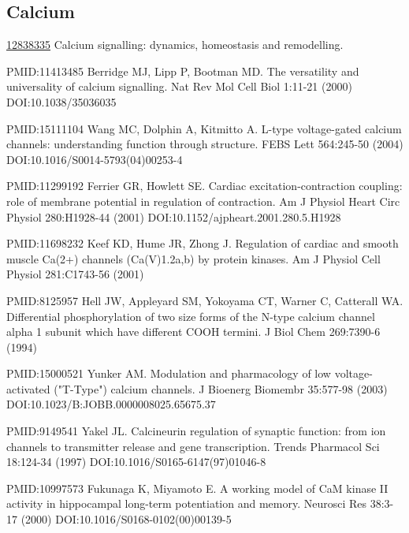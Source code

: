 \begin{thebibliography}{00}
\section{Calcium} 

\href{https://www.ncbi.nlm.nih.gov//pubmed//12838335}{12838335} Calcium signalling: dynamics, homeostasis and remodelling.

PMID:11413485
 Berridge MJ, Lipp P, Bootman MD.
\newblock The versatility and universality of calcium signalling.
\newblock Nat Rev Mol Cell Biol 1:11-21 (2000) DOI:10.1038/35036035

PMID:15111104
 Wang MC, Dolphin A, Kitmitto A.
\newblock L-type voltage-gated calcium channels: understanding function through structure.
\newblock FEBS Lett 564:245-50 (2004) DOI:10.1016/S0014-5793(04)00253-4

PMID:11299192
 Ferrier GR, Howlett SE.
\newblock Cardiac excitation-contraction coupling: role of membrane potential in regulation of contraction.
\newblock Am J Physiol Heart Circ Physiol 280:H1928-44 (2001) DOI:10.1152/ajpheart.2001.280.5.H1928

PMID:11698232
 Keef KD, Hume JR, Zhong J.
\newblock Regulation of cardiac and smooth muscle Ca(2+) channels (Ca(V)1.2a,b) by protein kinases.
\newblock Am J Physiol Cell Physiol 281:C1743-56 (2001)

PMID:8125957
 Hell JW, Appleyard SM, Yokoyama CT, Warner C, Catterall WA.
\newblock Differential phosphorylation of two size forms of the N-type calcium channel alpha 1 subunit which have different COOH termini.
\newblock J Biol Chem 269:7390-6 (1994)

PMID:15000521
 Yunker AM.
\newblock Modulation and pharmacology of low voltage-activated ("T-Type") calcium channels.
\newblock J Bioenerg Biomembr 35:577-98 (2003) DOI:10.1023/B:JOBB.0000008025.65675.37

PMID:9149541
 Yakel JL.
\newblock Calcineurin regulation of synaptic function: from ion channels to transmitter release and gene transcription.
\newblock Trends Pharmacol Sci 18:124-34 (1997) DOI:10.1016/S0165-6147(97)01046-8

PMID:10997573
 Fukunaga K, Miyamoto E.
\newblock A working model of CaM kinase II activity in hippocampal long-term potentiation and memory.
\newblock Neurosci Res 38:3-17 (2000) DOI:10.1016/S0168-0102(00)00139-5


\end{thebibliography}
